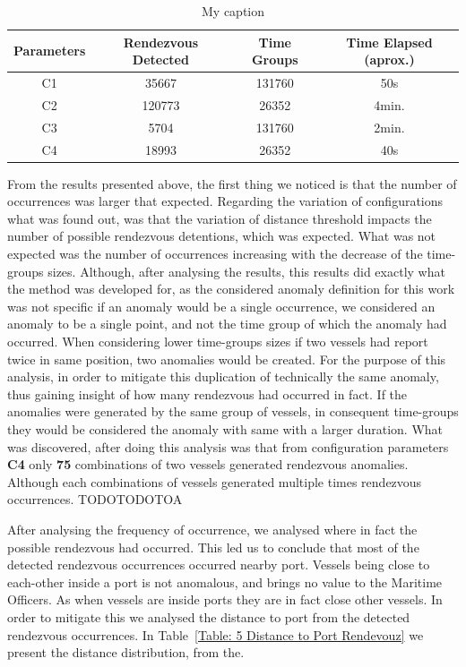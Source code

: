 \begin{table}[H]
\centering
\caption{My caption}
\label{Table: 5 ADS Rendezvous results}
\begin{tabular}{@{}cccc@{}}
\toprule
Parameters & Rendezvous Detected & Time Groups & Time Elapsed (aprox.) \\ \midrule
C1 & 35667 & 131760 & 50s \\
C2 & 120773 & 26352 & 4min. \\
C3 & 5704 & 131760 & 2min. \\
C4 & 18993 & 26352 & 40s \\ \bottomrule
\end{tabular}
\end{table}

From the results presented above, the first thing we noticed is that the number of occurrences was larger that expected. Regarding the variation of configurations what was found out, was that the variation of distance threshold impacts the number of possible rendezvous detentions, which was expected.
What was not expected was the number of occurrences increasing with the decrease of the time-groups sizes. 
Although, after analysing the results, this results did exactly what the method was developed for, as the considered anomaly definition for this work was not specific if an anomaly would be a single occurrence, we considered an anomaly to be a single point, and not the time group of which the anomaly had occurred. When considering lower time-groups sizes if two vessels had report twice in same position, two anomalies would be created. For the purpose of this analysis, in order to mitigate this duplication of technically the same anomaly, thus gaining insight of how many rendezvous had occurred in fact. If the anomalies were generated by the same group of vessels, in consequent time-groups they would be considered the anomaly with same with a larger duration. 
What was discovered, after doing this analysis was that from configuration parameters \textbf{C4} only \textbf{75} combinations of two vessels generated rendezvous anomalies. Although each combinations of vessels generated multiple times rendezvous occurrences. TODOTODOTOA

After analysing the frequency of occurrence, we analysed where in fact the possible rendezvous had occurred. This led us to conclude that most of the detected rendezvous occurrences occurred nearby port. Vessels being close to each-other inside a port is not anomalous, and brings no value to the Maritime Officers. As when vessels are inside ports they are in fact close other vessels. In order to mitigate this we analysed the distance to port from the detected rendezvous occurrences. In Table~\ref{Table: 5 Distance to Port Rendevouz} we present the distance distribution, from the.

